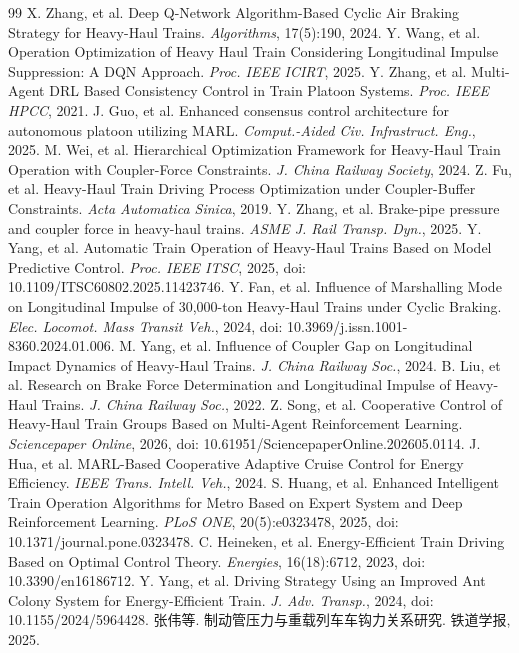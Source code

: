 \documentclass[11pt]{article}
\begin{document}
\begin{thebibliography}{99}
 X. Zhang, et al. Deep Q-Network Algorithm-Based Cyclic Air Braking Strategy for Heavy-Haul Trains. \textit{Algorithms}, 17(5):190, 2024.
 Y. Wang, et al. Operation Optimization of Heavy Haul Train Considering Longitudinal Impulse Suppression: A DQN Approach. \textit{Proc. IEEE ICIRT}, 2025.
 Y. Zhang, et al. Multi-Agent DRL Based Consistency Control in Train Platoon Systems. \textit{Proc. IEEE HPCC}, 2021.
 J. Guo, et al. Enhanced consensus control architecture for autonomous platoon utilizing MARL. \textit{Comput.-Aided Civ. Infrastruct. Eng.}, 2025.
 M. Wei, et al. Hierarchical Optimization Framework for Heavy-Haul Train Operation with Coupler-Force Constraints. \textit{J. China Railway Society}, 2024.
 Z. Fu, et al. Heavy-Haul Train Driving Process Optimization under Coupler-Buffer Constraints. \textit{Acta Automatica Sinica}, 2019.
 Y. Zhang, et al. Brake-pipe pressure and coupler force in heavy-haul trains. \textit{ASME J. Rail Transp. Dyn.}, 2025.
 Y. Yang, et al. Automatic Train Operation of Heavy-Haul Trains Based on Model Predictive Control. \textit{Proc. IEEE ITSC}, 2025, doi: 10.1109/ITSC60802.2025.11423746.
 Y. Fan, et al. Influence of Marshalling Mode on Longitudinal Impulse of 30,000-ton Heavy-Haul Trains under Cyclic Braking. \textit{Elec. Locomot. Mass Transit Veh.}, 2024, doi: 10.3969/j.issn.1001-8360.2024.01.006.
 M. Yang, et al. Influence of Coupler Gap on Longitudinal Impact Dynamics of Heavy-Haul Trains. \textit{J. China Railway Soc.}, 2024.
 B. Liu, et al. Research on Brake Force Determination and Longitudinal Impulse of Heavy-Haul Trains. \textit{J. China Railway Soc.}, 2022.
 Z. Song, et al. Cooperative Control of Heavy-Haul Train Groups Based on Multi-Agent Reinforcement Learning. \textit{Sciencepaper Online}, 2026, doi: 10.61951/SciencepaperOnline.202605.0114.
 J. Hua, et al. MARL-Based Cooperative Adaptive Cruise Control for Energy Efficiency. \textit{IEEE Trans. Intell. Veh.}, 2024.
 S. Huang, et al. Enhanced Intelligent Train Operation Algorithms for Metro Based on Expert System and Deep Reinforcement Learning. \textit{PLoS ONE}, 20(5):e0323478, 2025, doi: 10.1371/journal.pone.0323478.
 C. Heineken, et al. Energy-Efficient Train Driving Based on Optimal Control Theory. \textit{Energies}, 16(18):6712, 2023, doi: 10.3390/en16186712.
 Y. Yang, et al. Driving Strategy Using an Improved Ant Colony System for Energy-Efficient Train. \textit{J. Adv. Transp.}, 2024, doi: 10.1155/2024/5964428.
 张伟等. 制动管压力与重载列车车钩力关系研究. 铁道学报, 2025.
\end{thebibliography}
\end{document}
